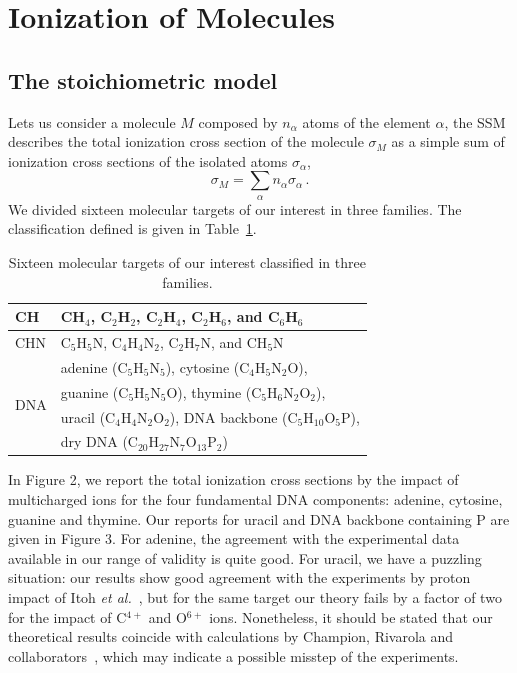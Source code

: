 \documentclass[preprint,12pt]{article}
\begin{document}
\section{Ionization of Molecules}

\subsection{The stoichiometric model}

Lets us consider a molecule $M$ composed by $n_{\alpha}$ atoms of the
element $\alpha$, the SSM describes the total ionization cross section 
of the molecule $\sigma_{M}$ as a simple sum of ionization cross 
sections of the isolated atoms $\sigma_{\alpha}$, 
\begin{equation}
 \sigma_{M}=\sum\limits_{\alpha}n_{\alpha}\sigma_{\alpha}\,.  
 \label{eq:sumion}
\end{equation}
We divided sixteen molecular targets of our interest in three families. 
The classification defined is given in Table~\ref{tab:families}.
\begin{table}
\begin{center}
\begin{tabular}{|p{}|p{}|}
\hline
 CH  & CH$_4$, C$_2$H$_2$, C$_2$H$_4$, C$_2$H$_6$, and C$_6$H$_6$ \\
\hline
 CHN & C$_5$H$_5$N, C$_4$H$_4$N$_2$, C$_2$H$_7$N, and CH$_5$N \\
\hline
 \multirow{4}{*}{DNA} & adenine (C$_5$H$_5$N$_5$), 
                        cytosine (C$_4$H$_5$N$_2$O), \\
     & guanine (C$_5$H$_5$N$_5$O), thymine (C$_5$H$_6$N$_2$O$_2$), \\
     & uracil (C$_4$H$_4$N$_2$O$_2$), DNA backbone (C$_5$H$_{10}$O$_5$P), \\
     & dry DNA (C$_{20}$H$_{27}$N$_7$O$_{13}$P$_2$)\\
\hline
\end{tabular}
\caption{Sixteen molecular targets of our interest classified in three 
families.}
\label{tab:families}
\end{center}
\end{table}

In Figure 2, we report the total ionization cross sections by the 
impact of multicharged ions for the four fundamental DNA components: 
adenine, cytosine, guanine and thymine. Our reports for uracil and 
DNA backbone containing P are given in Figure 3. For adenine, the 
agreement with the experimental data available in our range of validity 
is quite good. For uracil, we have a puzzling situation: our results 
show good agreement with the experiments by proton impact of Itoh 
{\it et al.}~\cite{itoh2013}, but for the same target our theory fails 
by a factor of two for the impact of C$^{4+}$ and O$^{6+}$ ions. 
Nonetheless, it should be stated that our theoretical results coincide 
with calculations by Champion, Rivarola and 
collaborators~\cite{champion2012,agnihotri2012}, which may indicate a 
possible misstep of the experiments. 
\end{document}
